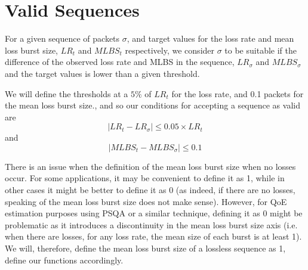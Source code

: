 \documentclass{article}
\renewcommand{\leq}{\leqslant}
\begin{document}
\section{Valid Sequences}
\label{sec:valid}

 For a given sequence of packets $\sigma$, and target values for the loss rate
and mean loss burst size, $LR_{t}$ and $MLBS_{t}$ respectively, we consider
$\sigma$ to be suitable if the difference of the observed loss rate and MLBS in
the sequence, $LR_{\sigma}$ and $MLBS_{\sigma}$ and the target values is lower
than a given threshold.

We will define the thresholds at a $5\%$ of $LR_{t}$ for the loss rate, and 0.1
packets for the mean loss burst size., and so our conditions for accepting a 
sequence as valid are
$$
\mid LR_t - LR_{ \sigma }\mid \leq 0.05 \times LR_{t}
$$
and
$$
\mid MLBS_{t} - MLBS_{ \sigma }\mid \leq 0.1
$$

There is an issue when the definition of the mean loss burst size when no losses
occur. For some applications, it may be convenient to define it as 1, while in
other cases it might be better to define it as 0 (as indeed, if there are no
losses, speaking of the mean loss burst size does not make sense). However, for
QoE estimation purposes using PSQA or a similar technique, defining it as 0
might be problematic as it introduces a discontinuity in the mean loss burst
size axis (i.e. when there are losses, for any loss rate, the mean size of each
burst is at least 1). We will, therefore, define the mean loss burst size
of a lossless sequence as 1, define our functions accordingly.\\
\end{document}
